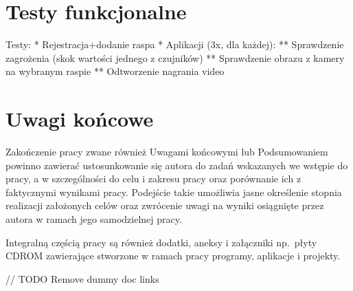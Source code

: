 \chapter{Testy funkcjonalne}

Testy:
 * Rejestracja+dodanie raspa
 * Aplikacji (3x, dla każdej):
 ** Sprawdzenie zagrożenia (skok wartości jednego z czujników)
 ** Sprawdzenie obrazu z kamery na wybranym raspie
 ** Odtworzenie nagrania video

\chapter{Uwagi końcowe}

Zakończenie pracy zwane również Uwagami końcowymi lub Podsumowaniem powinno zawierać ustosunkowanie
się autora do zadań wskazanych we wstępie do pracy, a w szczególności do celu i zakresu pracy oraz
porównanie ich z faktycznymi wynikami pracy. Podejście takie umożliwia jasne określenie stopnia
realizacji założonych celów oraz zwrócenie uwagi na wyniki osiągnięte przez autora w ramach jego
samodzielnej pracy.

Integralną częścią pracy są również dodatki, aneksy i załączniki np.~płyty CDROM
zawierające stworzone w ramach pracy programy, aplikacje i projekty.

// TODO Remove dummy doc links
\cite{MDESIGN}
\cite{RXJAVA}
\cite{KOTLIN}
\cite{RPI}
\cite{firebase}
\cite{android}
\cite{azure}
\cite{kotlin}